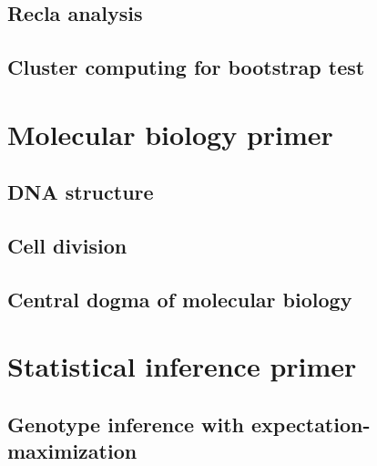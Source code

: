 \documentclass[oneside]{book}\usepackage[]{graphicx}\usepackage[]{color}
\begin{document}
\section{Recla analysis}

\section{Cluster computing for bootstrap test}





\printbibliography



\newpage
\begin{appendices}
\appendixpage

\chapter{Molecular biology primer}\label{sec:bio-primer}

\section{DNA structure}\label{sec:dna-structure}
\section{Cell division}\label{sec:cell-division}

\section{Central dogma of molecular biology}\label{sec:central-dogma}



\chapter{Statistical inference primer}\label{sec:stat-primer}




\section{Genotype inference with expectation-maximization}\label{sec:genotypes-em}









\end{appendices}
\end{document}
